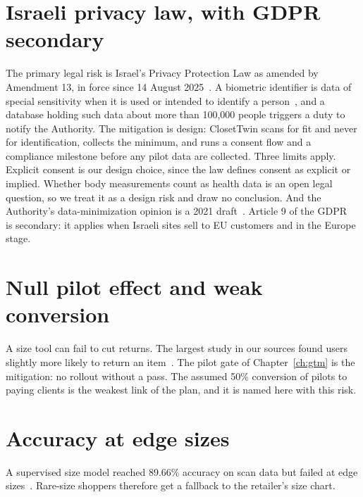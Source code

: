 \section{Israeli privacy law, with GDPR secondary}\label{sec:legal-risk}
The primary legal risk is Israel's Privacy Protection Law as amended by Amendment 13, in force since 14 August 2025~\cite{il_amend13_2024}. A biometric identifier is data of special sensitivity when it is used or intended to identify a person~\cite{il_ppl_en}, and a database holding such data about more than 100,000 people triggers a duty to notify the Authority. The mitigation is design: ClosetTwin scans for fit and never for identification, collects the minimum, and runs a consent flow and a compliance milestone before any pilot data are collected. Three limits apply. Explicit consent is our design choice, since the law defines consent as explicit or implied. Whether body measurements count as health data is an open legal question, so we treat it as a design risk and draw no conclusion. And the Authority's data-minimization opinion is a 2021 draft~\cite{ppa_data_minimization2021}. Article 9 of the GDPR~\cite{gdpr2016} is secondary: it applies when Israeli sites sell to EU customers and in the Europe stage.

\section{Null pilot effect and weak conversion}\label{sec:null-effect}
A size tool can fail to cut returns. The largest study in our sources found users slightly more likely to return an item~\cite{patel2025}. The pilot gate of Chapter~\ref{ch:gtm} is the mitigation: no rollout without a pass. The assumed 50\% conversion of pilots to paying clients is the weakest link of the plan, and it is named here with this risk.

\section{Accuracy at edge sizes}\label{sec:edge-sizes}
A supervised size model reached 89.66\% accuracy on scan data but failed at edge sizes~\cite{alhassawi2025}. Rare-size shoppers therefore get a fallback to the retailer's size chart.

